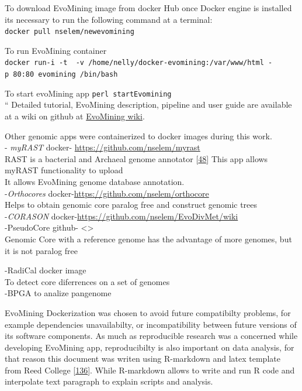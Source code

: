 \documentclass[12pt,twoside]{reedthesis}
\begin{document}
  To download EvoMining image from docker Hub once Docker engine is
  installed its necessary to run the following command at a terminal:\\
  \texttt{docker\ pull\ nselem/newevomining}
  
  To run EvoMining container\\
  \texttt{docker\ run-i\ -t\ \ -v\ /home/nelly/docker-evomining:/var/www/html\ -p\ 80:80\ evomining\ /bin/bash}
  
  To start evoMining app \texttt{perl\ startEvomining}\\
  `` Detailed tutorial, EvoMining description, pipeline and user guide are
  available at a wiki on github at
  \href{https://github.com/nselem/EvoMining/wiki}{EvoMining wiki}.
  
  Other genomic apps were containerized to docker images during this
  work.\\
  - \emph{myRAST} docker- \url{https://github.com/nselem/myrast}\\
  RAST is a bacterial and Archaeal genome annotator
  {[}\protect\hyperlink{ref-azizux5frastux5f2008}{48}{]} This app allows
  myRAST functionality to upload\\
  It allows EvoMining genome database annotation.\\
  -\emph{Orthocores} docker-\url{https://github.com/nselem/orthocore}\\
  Helps to obtain genomic core paralog free and construct genomic trees\\
  -\emph{CORASON} docker-\url{https://github.com/nselem/EvoDivMet/wiki}\\
  -PseudoCore github- \textless{}\textgreater{}\\
  Genomic Core with a reference genome has the advantage of more genomes,
  but it is not paralog free
  
  -RadiCal docker image\\
  To detect core diferrences on a set of genomes\\
  -BPGA to analize pangenome
  
  EvoMining Dockerization was chosen to avoid future compatibilty
  problems, for example dependencies unavailabilty, or incompatibility
  between future versions of its software components. As much as
  reproducible research was a concerned while developing EvoMining app,
  reproducibilty is also important on data analysis, for that reason this
  document was writen using R-markdown and latex template from Reed
  College
  {[}\protect\hyperlink{ref-chesterismayux5fupdatedux5f2016}{136}{]}.
  While R-markdown allows to write and run R code and interpolate text
  paragraph to explain scripts and analysis.
  
\end{document}
